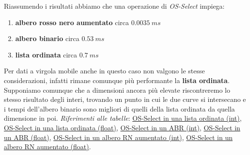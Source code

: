 \documentclass[onecolumn]{article}
\begin{document}
Riassumendo i risultati abbiamo che una operazione di \textit{OS-Select} impiega:
\begin{enumerate}
    \item \textbf{albero rosso nero aumentato} circa \(0.0035\:ms\)
    \item \textbf{albero binario} circa \(0.53\:ms\)
    \item \textbf{lista ordinata} circa \(0.7\:ms\)
\end{enumerate}

Per dati a virgola mobile anche in questo caso non valgono le stesse considerazioni, infatti rimane comunque più performante la \textbf{lista ordinata}. Supponiamo comunque che a dimensioni ancora più elevate riscontreremo lo stesso risultato degli interi, trovando un punto in cui le due curve si intersecano e i tempi dell'albero binario sono migliori di quelli della lista ordinata da quella dimensione in poi.
\newline
\newline
\textit{Riferimenti alle tabelle}: \hyperref[label:lista-ordinata-l-os-select]{OS-Select in una lista ordinata (int)}, \hyperref[label:lista-ordinata-l-float-os-select]{OS-Select in una lista ordinata (float)}, \hyperref[label:abr-l-os-select]{OS-Select in un ABR (int)}, \hyperref[label:abr-l-float-os-select]{OS-Select in un ABR (float)}, \hyperref[label:rn-aumentato-l-os-select]{OS-Select in un albero RN aumentato (int)}, \hyperref[label:rn-aumentato-l-float-os-select]{OS-Select in un albero RN aumentato (float)}.
\end{document}
